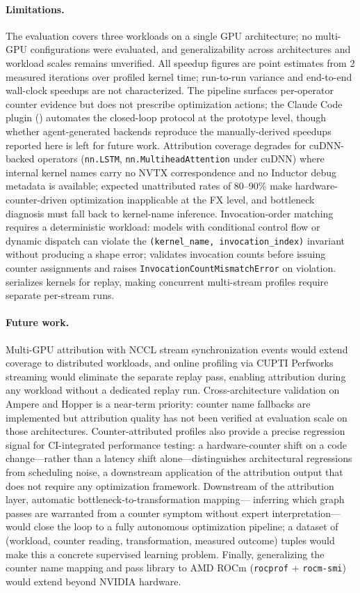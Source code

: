 \paragraph{Limitations.}
The evaluation covers three workloads on a single GPU architecture; no multi-GPU
configurations were evaluated, and generalizability across architectures and workload
scales remains unverified.
All speedup figures are point estimates from 2 measured iterations over profiled kernel
time; run-to-run variance and end-to-end wall-clock speedups are not characterized.
The pipeline surfaces per-operator counter evidence but does not prescribe optimization
actions; the Claude Code plugin () automates the closed-loop
protocol at the prototype level, though whether agent-generated backends reproduce the
manually-derived speedups reported here is left for future work.
Attribution coverage degrades for cuDNN-backed operators (\texttt{nn.LSTM},
\texttt{nn.\allowbreak MultiheadAttention} under cuDNN) where internal kernel names carry no
NVTX correspondence and no Inductor debug metadata is available; expected unattributed rates
of 80--90\% make hardware-counter-driven optimization inapplicable at the FX level, and
bottleneck diagnosis must fall back to kernel-name inference.
Invocation-order matching requires a deterministic workload: models with conditional control
flow or dynamic dispatch can violate the \texttt{(kernel\_name, invocation\_index)} invariant
without producing a shape error; \sys validates invocation counts before issuing counter
assignments and raises \texttt{InvocationCountMismatchError} on violation.
\ncu serializes kernels for replay, making concurrent multi-stream profiles require separate
per-stream runs.

\paragraph{Future work.}
Multi-GPU attribution with NCCL stream synchronization events would extend coverage to
distributed workloads, and online profiling via CUPTI Perfworks streaming would eliminate
the separate \ncu replay pass, enabling attribution during any workload without a
dedicated replay run.
Cross-architecture validation on Ampere and Hopper is a near-term priority: counter name
fallbacks are implemented but attribution quality has not been verified at evaluation scale
on those architectures.
Counter-attributed profiles also provide a precise regression signal for CI-integrated
performance testing: a hardware-counter shift on a code change---rather than a latency
shift alone---distinguishes architectural regressions from scheduling noise, a downstream
application of the attribution output that does not require any optimization framework.
Downstream of the attribution layer, automatic bottleneck-to-transformation mapping---
inferring which graph passes are warranted from a counter symptom without expert
interpretation---would close the loop to a fully autonomous optimization pipeline; a
dataset of (workload, counter reading, transformation, measured outcome) tuples would
make this a concrete supervised learning problem.
Finally, generalizing the counter name mapping and pass library to AMD ROCm
(\texttt{rocprof} + \texttt{rocm-smi}) would extend \sys beyond NVIDIA hardware.
